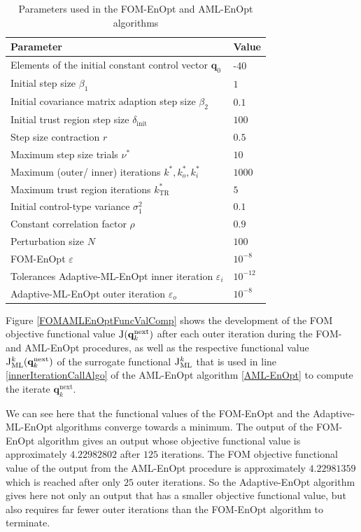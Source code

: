 \begin{table}[h]
\caption{\label{FOMAMLEnOptParameters}Parameters used in the FOM-EnOpt and AML-EnOpt algorithms}
\centering
\begin{tabular}{ll}
\hline
Parameter & Value\\
\hline
Elements of the initial constant control vector $\mathbf{q}_0$ & -40\\
Initial step size $\beta_1$ & $1$\\
Initial covariance matrix adaption step size $\beta_2$ & $0.1$\\
Initial trust region step size $\delta_\mathrm{init}$ & $100$\\
Step size contraction $r$ & $0.5$\\
Maximum step size trials $\nu^*$ & $10$\\
Maximum (outer/ inner) iterations $k^*, k^*_o, k^*_i$ & $1000$\\
Maximum trust region iterations $k^*_\mathrm{TR}$ & $5$\\
Initial control-type variance $\sigma^2_1$ & $0.1$\\
Constant correlation factor $\rho$ & $0.9$\\
Perturbation size $N$ & $100$\\
FOM-EnOpt $\varepsilon$ & $10^{-8}$\\
Tolerances Adaptive-ML-EnOpt inner iteration $\varepsilon_i$ & $10^{-12}$\\
Adaptive-ML-EnOpt outer iteration $\varepsilon_o$ & $10^{-8}$\\
\hline
\end{tabular}
\end{table}

Figure \ref{FOMAMLEnOptFuncValComp} shows the development of the FOM objective functional value $\Call{J}{\mathbf{q}^\mathrm{next}_k}$ after each outer iteration during the FOM- and AML-EnOpt procedures, as well as the respective functional value $\Call{J$^k_\mathrm{ML}$}{\mathbf{q}^\mathrm{next}_k}$ of the surrogate functional $\textproc{J$_\mathrm{ML}^k$}$ that is used in line \ref{innerIterationCallAlgo} of the AML-EnOpt algorithm \ref{AML-EnOpt} to compute the iterate $\mathbf{q}^\mathrm{next}_k$.%

We can see here that the functional values of the FOM-EnOpt and the Adaptive-ML-EnOpt algorithms converge towards a minimum. The output of the FOM-EnOpt algorithm gives an output whose objective functional value is approximately $4.22982802$ after $125$ iterations. The FOM objective functional value of the output from the AML-EnOpt procedure is approximately $4.22981359$ which is reached after only $25$ outer iterations. So the Adaptive-EnOpt algorithm gives here not only an output that has a smaller objective functional value, but also requires far fewer outer iterations than the FOM-EnOpt algorithm to terminate.\\

